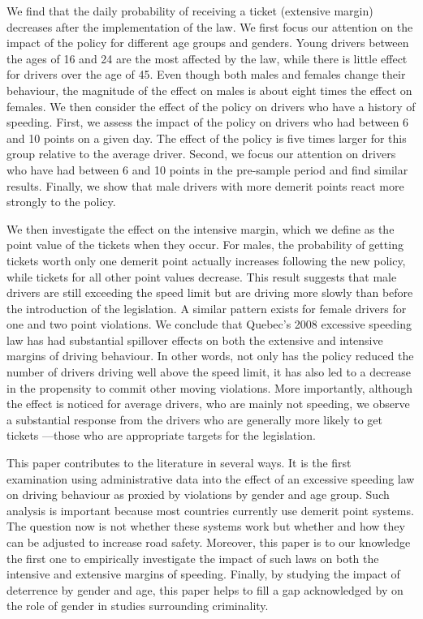 We find that the daily probability of receiving a ticket (extensive margin) 
decreases after the implementation of the law. We first focus our attention on the impact of the policy for different age groups and genders.
Young drivers between the ages of 16 and 24 are the most affected by the law, 
while there is little effect for drivers over the age of 45. 
Even though both males and females change their behaviour, the magnitude of the effect on males is about eight times the effect on females. 
We then consider the effect of the policy on drivers who have a history of speeding. First, we assess the impact of the policy on drivers who had between 6 and 10 points on a given day. The effect of the policy is five times larger for this group relative to the average driver. Second, we focus our attention on drivers who have had between 6 and 10 points in the pre-sample period and find similar results. Finally, we show that male drivers with more demerit points react more strongly to the policy.

We then investigate the effect on the intensive margin, which we define as the point value of the tickets when they occur. 
For males, the probability of getting tickets worth only one demerit point 
actually increases following the new policy, while tickets for all other point values decrease. 
This result suggests that male drivers are still exceeding the speed limit 
but are driving more slowly than before the introduction of the legislation. 
A similar pattern exists for female drivers for one and two point violations. 
%
We conclude that Quebec’s 2008 excessive speeding law has had substantial spillover effects 
on both the extensive and intensive margins of driving behaviour. 
In other words, not only has the policy reduced the number of drivers driving well above the speed limit, 
it has also led to a decrease in the propensity to commit other moving violations.
% 
More importantly, although the effect is noticed for average drivers, 
who are mainly not speeding, 
we observe a substantial response from the drivers who are generally more likely to get tickets%
---those who are appropriate targets for the legislation. 

This paper contributes to the literature in several ways. 
It is the first examination using administrative data into the effect of 
an excessive speeding law on driving behaviour 
as proxied by violations by gender and age group. 
Such analysis is important because most countries currently use demerit point systems. 
The question now is not whether these systems work 
but whether and how they can be adjusted to increase road safety. 
Moreover, this paper is to our knowledge the first one to empirically investigate 
the impact of such laws on both the intensive and extensive margins of speeding. 
Finally, by studying the impact of deterrence by gender and age, 
this paper helps to fill a gap acknowledged by 
\citet{freeman1999}
on the role of gender in studies surrounding criminality.


